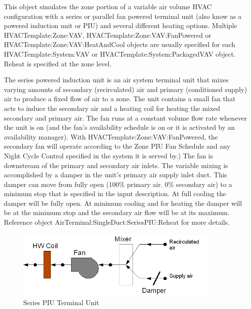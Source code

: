 This object simulates the zone portion of a variable air volume HVAC configuration with a series or parallel fan powered terminal unit (also know as a powered induction unit or PIU) and several different heating options. Multiple HVACTemplate:Zone:VAV, HVACTemplate:Zone:VAV:FanPowered or HVACTemplate:Zone:VAV:HeatAndCool objects are usually specified for each HVACTemplate:System:VAV or HVACTemplate:System:PackagedVAV object. Reheat is specified at the zone level.

The series powered induction unit is an air system terminal unit that mixes varying amounts of secondary (recirculated) air and primary (conditioned supply) air to produce a fixed flow of air to a zone. The unit contains a small fan that acts to induce the secondary air and a heating coil for heating the mixed secondary and primary air. The fan runs at a constant volume flow rate whenever the unit is on (and the fan's availability schedule is on or it is activated by an availability manager). With HVACTemplate:Zone:VAV:FanPowered, the secondary fan will operate according to the Zone PIU Fan Schedule and any Night Cycle Control specified in the system it is served by.) The fan is downstream of the primary and secondary air inlets. The variable mixing is accomplished by a damper in the unit's primary air supply inlet duct. This damper can move from fully open (100\% primary air. 0\% secondary air) to a minimum stop that is specified in the input description. At full cooling the damper will be fully open. At minimum cooling and for heating the damper will be at the minimum stop and the secondary air flow will be at its maximum. Reference object AirTerminal:SingleDuct:SeriesPIU:Reheat for more details.

\begin{figure}[hbtp] %
\centering
\includegraphics[width=0.9\textwidth, height=0.9\textheight, keepaspectratio=true]{media/image608.png}
\caption{Series PIU Terminal Unit \protect \label{fig:series-piu-terminal-unit-001}}
\end{figure}

